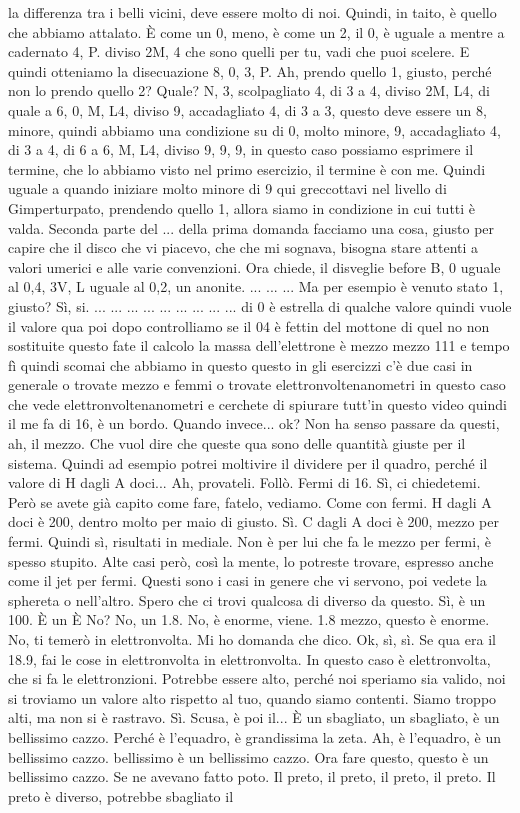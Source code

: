 \begin{soluzione}
{la differenza tra i belli vicini, deve essere molto di noi. Quindi, in taito, è quello che abbiamo attalato. È come un 0, meno, è come un 2, il 0, è uguale a mentre a cadernato 4, P. diviso 2M, 4 che sono quelli per tu, vadi che puoi scelere. E quindi otteniamo la disecuazione 8, 0, 3, P. Ah, prendo quello 1, giusto, perché non lo prendo quello 2? Quale? N, 3, scolpagliato 4, di 3 a 4, diviso 2M, L4, di quale a 6, 0, M, L4, diviso 9, accadagliato 4, di 3 a 3, questo deve essere un 8, minore, quindi abbiamo una condizione su di 0, molto minore, 9, accadagliato 4, di 3 a 4, di 6 a 6, M, L4, diviso 9, 9, 9, in questo caso possiamo esprimere il termine, che lo abbiamo visto nel primo esercizio, il termine è con me. Quindi uguale a quando iniziare molto minore di 9 qui greccottavi nel livello di Gimperturpato, prendendo quello 1, allora siamo in condizione in cui tutti è valda. Seconda parte del ... della prima domanda facciamo una cosa, giusto per capire che il disco che vi piacevo, che che mi sognava, bisogna stare attenti a valori umerici e alle varie convenzioni. Ora chiede, il disveglie before B, 0 uguale al 0,4, 3V, L uguale al 0,2, un anonite. ... ... ... Ma per esempio è venuto stato 1, giusto? Sì, si. ... ... ... ... ... ... ... ... ... di 0 è estrella di qualche valore quindi vuole il valore qua poi dopo controlliamo se il 04 è fettin del mottone di quel no non sostituite questo fate il calcolo la massa dell'elettrone è mezzo mezzo 111 e tempo fì quindi scomai che abbiamo in questo questo in gli esercizzi c'è due casi in generale o trovate mezzo e femmi o trovate elettronvoltenanometri in questo caso che vede elettronvoltenanometri e cerchete di spiurare tutt'in questo video quindi il me fa di 16, è un bordo. Quando invece... ok? Non ha senso passare da questi, ah, il mezzo. Che vuol dire che queste qua sono delle quantità giuste per il sistema. Quindi ad esempio potrei moltivire il dividere per il quadro, perché il valore di H dagli A doci... Ah, provateli. Follò. Fermi di 16. Sì, ci chiedetemi. Però se avete già capito come fare, fatelo, vediamo. Come con fermi. H dagli A doci è 200, dentro molto per maio di giusto. Sì. C dagli A doci è 200, mezzo per fermi. Quindi sì, risultati in mediale. Non è per lui che fa le mezzo per fermi, è spesso stupito. Alte casi però, così la mente, lo potreste trovare, espresso anche come il jet per fermi. Questi sono i casi in genere che vi servono, poi vedete la sphereta o nell'altro. Spero che ci trovi qualcosa di diverso da questo. Sì, è un 100. È un È No? No, un 1.8. No, è enorme, viene. 1.8 mezzo, questo è enorme. No, ti temerò in elettronvolta. Mi ho domanda che dico. Ok, sì, sì. Se qua era il 18.9, fai le cose in elettronvolta in elettronvolta. In questo caso è elettronvolta, che si fa le elettronzioni. Potrebbe essere alto, perché noi speriamo sia valido, noi si troviamo un valore alto rispetto al tuo, quando siamo contenti. Siamo troppo alti, ma non si è rastravo. Sì. Scusa, è poi il... È un sbagliato, un sbagliato, è un bellissimo cazzo. Perché è l'equadro, è grandissima la zeta. Ah, è l'equadro, è un bellissimo cazzo. bellissimo è un bellissimo cazzo. Ora fare questo, questo è un bellissimo cazzo. Se ne avevano fatto poto. Il preto, il preto, il preto, il preto. Il preto è diverso, potrebbe sbagliato il }
\end{soluzione}
